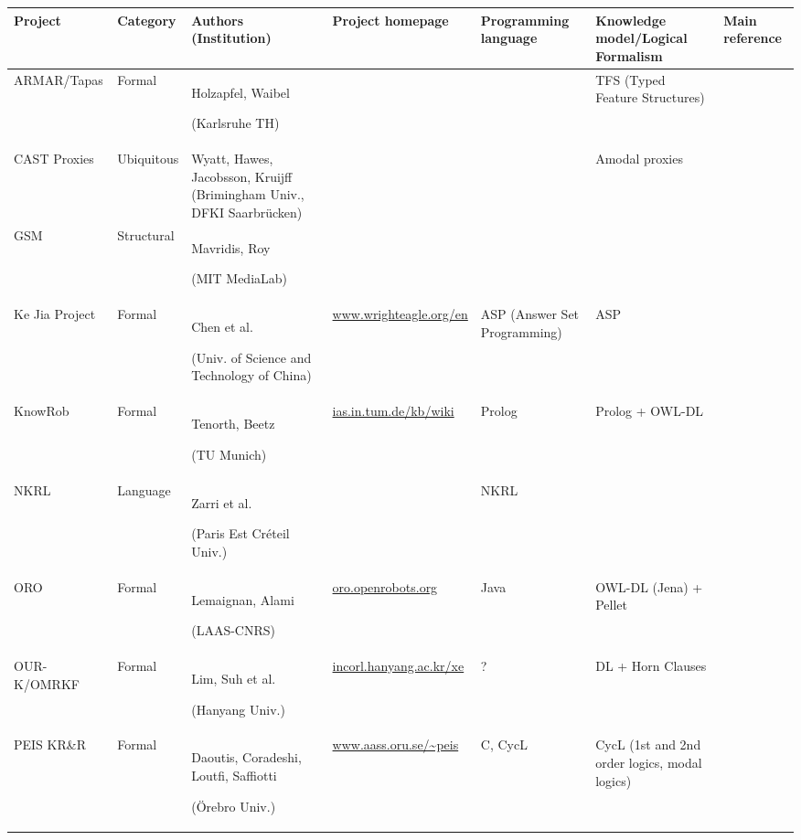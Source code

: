 \documentclass{IEEEtran}
\begin{document}
\begin{landscape}
\begin{table}\scriptsize
\begin{center}

\begin{tabular}{p{2.2cm}p{1.6cm}p{4cm}lp{2.4cm}p{3.4cm}p{1.5cm}}
\toprule
{\bf Project} & {\bf Category} & {\bf Authors (Institution)} & {\bf Project homepage} & {\bf Programming language} & {\bf Knowledge model/Logical Formalism} & Main reference \\
\midrule
ARMAR/Tapas & Formal & Holzapfel, Waibel \par (Karlsruhe TH) & & & TFS (Typed Feature Structures) & \cite{Holzapfel2008}\\
CAST Proxies & Ubiquitous & Wyatt, Hawes, Jacobsson, Kruijff (Brimingham Univ., DFKI Saarbrücken) & & & Amodal proxies & \cite{Jacobsson2008} \\
GSM & Structural & Mavridis, Roy \par (MIT MediaLab) & & & & \cite{Mavridis2006} \\
Ke Jia Project & Formal & Chen et al. \par (Univ. of Science and Technology of China) & \url{www.wrighteagle.org/en} & ASP (Answer Set Programming) & ASP & \cite{Chen2010} \\
{\sc KnowRob} & Formal & Tenorth, Beetz \par (TU Munich) & \url{ias.in.tum.de/kb/wiki} & {\sc Prolog} & {\sc Prolog} + OWL-DL &  \cite{Tenorth2009a} \\
NKRL & Language & Zarri et al. \par (Paris Est Créteil Univ.) & & NKRL & & \cite{Sabri2011} \\
ORO & Formal & Lemaignan, Alami \par (LAAS-CNRS) & \url{oro.openrobots.org} & {\sc Java} & OWL-DL ({\sc Jena}) + {\sc Pellet} & \cite{Lemaignan2010} \\
OUR-K/OMRKF & Formal & Lim, Suh et al. \par (Hanyang Univ.) & \url{incorl.hanyang.ac.kr/xe} & ? & DL + Horn Clauses &  \cite{Lim2011, Suh2007} \\
PEIS KR\&R & Formal & Daoutis, Coradeshi, Loutfi, Saffiotti \par (Örebro Univ.) & \url{www.aass.oru.se/~peis} & {\sc C}, {\sc CycL} & CycL (1st and 2nd order logics, modal logics) & \cite{Daoutis2009} \\

\end{tabular}
\end{center}
\end{table}
\end{landscape}
\end{document}
